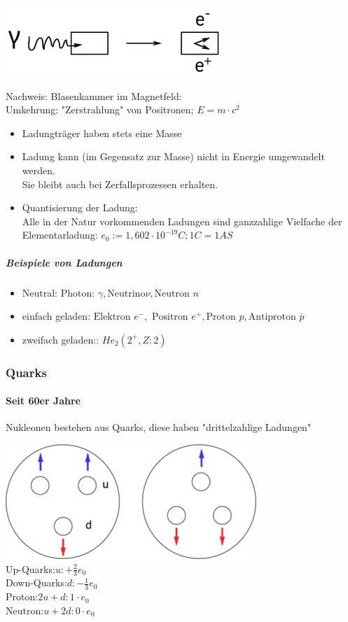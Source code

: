 \documentclass[11pt]{article}
\begin{document}
				\includegraphics{skizzen/14/14_1B2}
				
				\newpage
				
				\noindent Nachweis: Blasenkammer im Magnetfeld:  \hfill \\
				Umkehrung: "Zerstrahlung" von Positronen; $E=m\cdot c^2$
				\begin{itemize}
					\item Ladungtr\"{a}ger haben stets eine Masse
					\item Ladung kann (im Gegensatz zur Masse) nicht in Energie umgewandelt werden. \\
					      Sie bleibt auch bei Zerfallsprozessen erhalten.
					\item Quantisierung der Ladung:\\
						Alle in der Natur vorkommenden Ladungen sind ganzzahlige Vielfache der Elementarladung: $e_0:=1,602\cdot10^{-19}C; 1C=1AS$
				\end{itemize}
				\subparagraph{Beispiele von Ladungen}
				\begin{itemize}
					\item Neutral: $\text{Photon: }\gamma, \text{Neutrino}\nu, \text{Neutron }n$
					\item einfach geladen: $\text{Elektron }e^-,\text{ Positron } e^+, \text{Proton }p, \text{Antiproton }\bar{p}$
					\item zweifach geladen:: $He_2(2^+,Z:2)$
				\end{itemize}	
				

\subsubsection{Quarks }	
\paragraph{Seit 60er Jahre}
Nukleonen bestehen aus Quarks, diese haben "drittelzahlige Ladungen"

\includegraphics{skizzen/14/14_1B5}
\\
Up-Quarks:$u:+\frac{2}{3	}e_0$
\\
Down-Quarks:$d:-\frac{1}{3}e_0$
\\
Proton:$2u+d: 1\cdot e_0$
\\
Neutron:$u+2d: 0\cdot e_0$
\\
\end{document}
